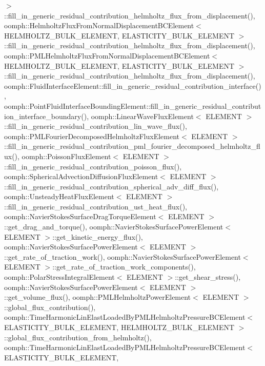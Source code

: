 $>$\+::fill\+\_\+in\+\_\+generic\+\_\+residual\+\_\+contribution\+\_\+helmholtz\+\_\+flux\+\_\+from\+\_\+displacement(), oomph\+::\+Helmholtz\+Flux\+From\+Normal\+Displacement\+B\+C\+Element$<$ H\+E\+L\+M\+H\+O\+L\+T\+Z\+\_\+\+B\+U\+L\+K\+\_\+\+E\+L\+E\+M\+E\+N\+T, E\+L\+A\+S\+T\+I\+C\+I\+T\+Y\+\_\+\+B\+U\+L\+K\+\_\+\+E\+L\+E\+M\+E\+N\+T $>$\+::fill\+\_\+in\+\_\+generic\+\_\+residual\+\_\+contribution\+\_\+helmholtz\+\_\+flux\+\_\+from\+\_\+displacement(), oomph\+::\+P\+M\+L\+Helmholtz\+Flux\+From\+Normal\+Displacement\+B\+C\+Element$<$ H\+E\+L\+M\+H\+O\+L\+T\+Z\+\_\+\+B\+U\+L\+K\+\_\+\+E\+L\+E\+M\+E\+N\+T, E\+L\+A\+S\+T\+I\+C\+I\+T\+Y\+\_\+\+B\+U\+L\+K\+\_\+\+E\+L\+E\+M\+E\+N\+T $>$\+::fill\+\_\+in\+\_\+generic\+\_\+residual\+\_\+contribution\+\_\+helmholtz\+\_\+flux\+\_\+from\+\_\+displacement(), oomph\+::\+Fluid\+Interface\+Element\+::fill\+\_\+in\+\_\+generic\+\_\+residual\+\_\+contribution\+\_\+interface(), oomph\+::\+Point\+Fluid\+Interface\+Bounding\+Element\+::fill\+\_\+in\+\_\+generic\+\_\+residual\+\_\+contribution\+\_\+interface\+\_\+boundary(), oomph\+::\+Linear\+Wave\+Flux\+Element$<$ E\+L\+E\+M\+E\+N\+T $>$\+::fill\+\_\+in\+\_\+generic\+\_\+residual\+\_\+contribution\+\_\+lin\+\_\+wave\+\_\+flux(), oomph\+::\+P\+M\+L\+Fourier\+Decomposed\+Helmholtz\+Flux\+Element$<$ E\+L\+E\+M\+E\+N\+T $>$\+::fill\+\_\+in\+\_\+generic\+\_\+residual\+\_\+contribution\+\_\+pml\+\_\+fourier\+\_\+decomposed\+\_\+helmholtz\+\_\+flux(), oomph\+::\+Poisson\+Flux\+Element$<$ E\+L\+E\+M\+E\+N\+T $>$\+::fill\+\_\+in\+\_\+generic\+\_\+residual\+\_\+contribution\+\_\+poisson\+\_\+flux(), oomph\+::\+Spherical\+Advection\+Diffusion\+Flux\+Element$<$ E\+L\+E\+M\+E\+N\+T $>$\+::fill\+\_\+in\+\_\+generic\+\_\+residual\+\_\+contribution\+\_\+spherical\+\_\+adv\+\_\+diff\+\_\+flux(), oomph\+::\+Unsteady\+Heat\+Flux\+Element$<$ E\+L\+E\+M\+E\+N\+T $>$\+::fill\+\_\+in\+\_\+generic\+\_\+residual\+\_\+contribution\+\_\+ust\+\_\+heat\+\_\+flux(), oomph\+::\+Navier\+Stokes\+Surface\+Drag\+Torque\+Element$<$ E\+L\+E\+M\+E\+N\+T $>$\+::get\+\_\+drag\+\_\+and\+\_\+torque(), oomph\+::\+Navier\+Stokes\+Surface\+Power\+Element$<$ E\+L\+E\+M\+E\+N\+T $>$\+::get\+\_\+kinetic\+\_\+energy\+\_\+flux(), oomph\+::\+Navier\+Stokes\+Surface\+Power\+Element$<$ E\+L\+E\+M\+E\+N\+T $>$\+::get\+\_\+rate\+\_\+of\+\_\+traction\+\_\+work(), oomph\+::\+Navier\+Stokes\+Surface\+Power\+Element$<$ E\+L\+E\+M\+E\+N\+T $>$\+::get\+\_\+rate\+\_\+of\+\_\+traction\+\_\+work\+\_\+components(), oomph\+::\+Polar\+Stress\+Integral\+Element$<$ E\+L\+E\+M\+E\+N\+T $>$\+::get\+\_\+shear\+\_\+stress(), oomph\+::\+Navier\+Stokes\+Surface\+Power\+Element$<$ E\+L\+E\+M\+E\+N\+T $>$\+::get\+\_\+volume\+\_\+flux(), oomph\+::\+P\+M\+L\+Helmholtz\+Power\+Element$<$ E\+L\+E\+M\+E\+N\+T $>$\+::global\+\_\+flux\+\_\+contribution(), oomph\+::\+Time\+Harmonic\+Lin\+Elast\+Loaded\+By\+P\+M\+L\+Helmholtz\+Pressure\+B\+C\+Element$<$ E\+L\+A\+S\+T\+I\+C\+I\+T\+Y\+\_\+\+B\+U\+L\+K\+\_\+\+E\+L\+E\+M\+E\+N\+T, H\+E\+L\+M\+H\+O\+L\+T\+Z\+\_\+\+B\+U\+L\+K\+\_\+\+E\+L\+E\+M\+E\+N\+T $>$\+::global\+\_\+flux\+\_\+contribution\+\_\+from\+\_\+helmholtz(), oomph\+::\+Time\+Harmonic\+Lin\+Elast\+Loaded\+By\+P\+M\+L\+Helmholtz\+Pressure\+B\+C\+Element$<$ E\+L\+A\+S\+T\+I\+C\+I\+T\+Y\+\_\+\+B\+U\+L\+K\+\_\+\+E\+L\+E\+M\+E\+N\+T, 